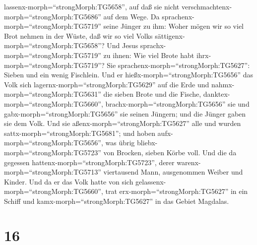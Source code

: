 lassenx-morph=``strongMorph:TG5658'', auf daß sie nicht
verschmachtenx-morph=``strongMorph:TG5686'' auf dem Wege. 
Da sprachenx-morph=``strongMorph:TG5719'' seine Jünger zu ihm: Woher
mögen wir so viel Brot nehmen in der Wüste, daß wir so viel Volks
sättigenx-morph=``strongMorph:TG5658''?  Und Jesus
sprachx-morph=``strongMorph:TG5719'' zu ihnen: Wie viel Brote habt
ihrx-morph=``strongMorph:TG5719''? Sie
sprachenx-morph=``strongMorph:TG5627'': Sieben und ein wenig Fischlein.
 Und er hießx-morph=``strongMorph:TG5656'' das Volk sich
lagernx-morph=``strongMorph:TG5629'' auf die Erde  und
nahmx-morph=``strongMorph:TG5631'' die sieben Brote und die Fische,
danktex-morph=``strongMorph:TG5660'',
brachx-morph=``strongMorph:TG5656'' sie und
gabx-morph=``strongMorph:TG5656'' sie seinen Jüngern; und die Jünger
gaben sie dem Volk.  Und sie
aßenx-morph=``strongMorph:TG5627'' alle und wurden
sattx-morph=``strongMorph:TG5681''; und hoben
aufx-morph=``strongMorph:TG5656'', was übrig
bliebx-morph=``strongMorph:TG5723'' von Brocken, sieben Körbe voll.
 Und die da gegessen hattenx-morph=``strongMorph:TG5723'',
derer warenx-morph=``strongMorph:TG5713'' viertausend Mann, ausgenommen
Weiber und Kinder.  Und da er das Volk hatte von sich
gelassenx-morph=``strongMorph:TG5660'', trat
erx-morph=``strongMorph:TG5627'' in ein Schiff und
kamx-morph=``strongMorph:TG5627'' in das Gebiet Magdalas.

\hypertarget{section-15}{%
\section{16}\label{section-15}}

